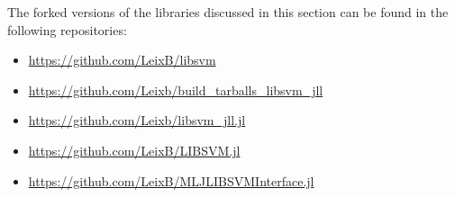 The forked versions of the libraries discussed in this section can be found in
the following repositories:
\begin{itemize}
    \item \url{https://github.com/LeixB/libsvm}
    \item \url{https://github.com/Leixb/build\_tarballs\_libsvm\_jll}
    \item \url{https://github.com/Leixb/libsvm\_jll.jl}
    \item \url{https://github.com/LeixB/LIBSVM.jl}
    \item \url{https://github.com/LeixB/MLJLIBSVMInterface.jl}
\end{itemize}


